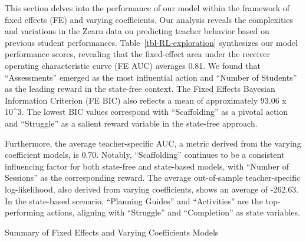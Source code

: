 \documentclass[
  number,
  preprint,
  3p,
  onecolumn]{elsarticle}
\begin{document}
This section delves into the performance of our model within the
framework of fixed effects (FE) and varying coefficients. Our analysis
reveals the complexities and variations in the Zearn data on predicting
teacher behavior based on previous student performances.
Table~\ref{tbl-RL-exploration} synthesizes our model performance scores,
revealing that the fixed-effect area under the receiver operating
characteristic curve (FE AUC) averages 0.81. We found that
``Assessments'' emerged as the most influential action and ``Number of
Students'' as the leading reward in the state-free context. The Fixed
Effects Bayesian Information Criterion (FE BIC) also reflects a mean of
approximately 93.06 x 10\^{}3. The lowest BIC values correspond with
``Scaffolding'' as a pivotal action and ``Struggle'' as a salient reward
variable in the state-free approach.

Furthermore, the average teacher-specific AUC, a metric derived from the
varying coefficient models, is 0.70. Notably, ``Scaffolding'' continues
to be a consistent influencing factor for both state-free and
state-based models, with ``Number of Sessions'' as the corresponding
reward. The average out-of-sample teacher-specific log-likelihood, also
derived from varying coefficients, shows an average of -262.63. In the
state-based scenario, ``Planning Guides'' and ``Activities'' are the
top-performing actions, aligning with ``Struggle'' and ``Completion'' as
state variables.

\begin{table}

\caption{\label{tbl-RL-exploration}Summary of Fixed Effects and Varying
Coefficients Models}


\end{table}%
\end{document}
